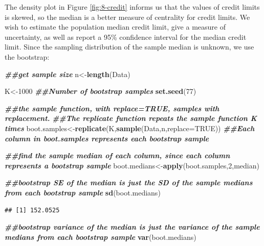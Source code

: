 \documentclass[
]{book}
\newenvironment{Shaded}{\begin{snugshade}}{\end{snugshade}}
\newcommand{\AttributeTok}[1]{\textcolor[rgb]{0.13,0.29,0.53}{#1}}
\newcommand{\ConstantTok}[1]{\textcolor[rgb]{0.56,0.35,0.01}{#1}}
\newcommand{\DecValTok}[1]{\textcolor[rgb]{0.00,0.00,0.81}{#1}}
\newcommand{\DocumentationTok}[1]{\textcolor[rgb]{0.56,0.35,0.01}{\textbf{\textit{#1}}}}
\newcommand{\FunctionTok}[1]{\textcolor[rgb]{0.13,0.29,0.53}{\textbf{#1}}}
\newcommand{\NormalTok}[1]{#1}
\newcommand{\OtherTok}[1]{\textcolor[rgb]{0.56,0.35,0.01}{#1}}
\begin{document}
The density plot in Figure \ref{fig:8-credit} informs us that the values of credit limits is skewed, so the median is a better measure of centrality for credit limits. We wish to estimate the population median credit limit, give a measure of uncertainty, as well as report a 95\% confidence interval for the median credit limit. Since the sampling distribution of the sample median is unknown, we use the bootstrap:

\begin{Shaded}
\begin{Highlighting}[]
\DocumentationTok{\#\#get sample size}
\NormalTok{n}\OtherTok{\textless{}{-}}\FunctionTok{length}\NormalTok{(Data)}

\NormalTok{K}\OtherTok{\textless{}{-}}\DecValTok{1000} \DocumentationTok{\#\#Number of bootstrap samples}
\FunctionTok{set.seed}\NormalTok{(}\DecValTok{77}\NormalTok{)}

\DocumentationTok{\#\#the sample function, with replace=TRUE, samples with replacement. }
\DocumentationTok{\#\#The replicate function repeats the sample function K times}
\NormalTok{boot.samples}\OtherTok{\textless{}{-}}\FunctionTok{replicate}\NormalTok{(K,}\FunctionTok{sample}\NormalTok{(Data,n,}\AttributeTok{replace=}\ConstantTok{TRUE}\NormalTok{))}
\DocumentationTok{\#\#Each column in boot.samples represents each bootstrap sample}

\DocumentationTok{\#\#find the sample median of each column, since each column represents a bootstrap sample}
\NormalTok{boot.medians}\OtherTok{\textless{}{-}}\FunctionTok{apply}\NormalTok{(boot.samples,}\DecValTok{2}\NormalTok{,median)}

\DocumentationTok{\#\#bootstrap SE of the median is just the SD of the sample medians from each bootstrap sample}
\FunctionTok{sd}\NormalTok{(boot.medians)}
\end{Highlighting}
\end{Shaded}

\begin{verbatim}
## [1] 152.0525
\end{verbatim}

\begin{Shaded}
\begin{Highlighting}[]
\DocumentationTok{\#\#bootstrap variance of the median is just the variance of the sample medians from each bootstrap sample}
\FunctionTok{var}\NormalTok{(boot.medians)}
\end{Highlighting}
\end{Shaded}
\end{document}
